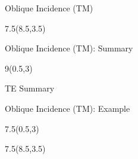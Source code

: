 \begin{lesson40}
\begin{frame}{Oblique Incidence (TM)}
\begin{textblock}{7.5}(8.5,3.5)


\end{textblock}
\end{frame}


\begin{frame}{Oblique Incidence (TM): Summary}
\begin{textblock}{9}(0.5,3) 
\begin{myblock}[0.9]{TE Summary}
\end{myblock}
\end{textblock}
\end{frame}


\begin{frame}{Oblique Incidence (TM): Example}
\begin{textblock}{7.5}(0.5,3) 

\end{textblock}


\begin{textblock}{7.5}(8.5,3.5)


\end{textblock}
\end{frame}

\end{lesson40}